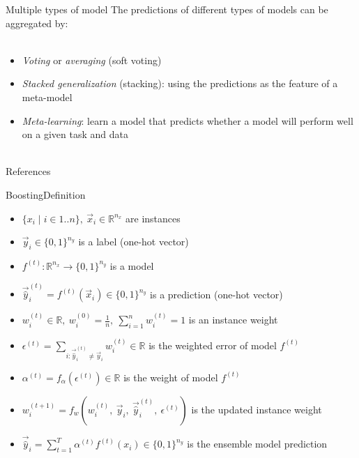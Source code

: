 \documentclass[10pt]{beamer}
\begin{document}
\begin{frame}{Multiple types of model}
  The predictions of different types of models can be aggregated by:
  \\~\
  \begin{itemize}
    \item \emph{Voting} or \emph{averaging} (soft voting)
    \item \emph{Stacked generalization} (stacking): using the predictions as
          the feature of a meta-model
    \item \emph{Meta-learning}: learn a model that predicts whether a model
          will perform well on a given task and data
          \\~\
  \end{itemize}
\end{frame}

\begin{frame}[allowframebreaks]{References}
  \renewcommand*{\bibfont}{\footnotesize}
  \printbibliography
\end{frame}

\begin{frame}{Boosting}{Definition}
  \begin{itemize}
    \item $\{x_i \mid i \in 1 .. n\},\ \vec{x}_i \in \mathbb{R}^{n_x}$ are
          instances
    \item $\vec{y}_i \in \{0,1\}^{n_y}$ is a label (one-hot vector)
    \item $f^{(t)} : \mathbb{R}^{n_x} \to \{0,1\}^{n_y}$ is a model
    \item $\vec{\hat{y}}_i^{(t)} = f^{(t)}(\vec{x}_i) \in \{0,1\}^{n_y}$ is a
          prediction (one-hot vector)
    \item $w_i^{(t)} \in \mathbb{R},\ w_i^{(0)} = \frac{1}{n},\
            \sum_{i = 1}^{n}w^{(t)}_i = 1$ is an instance weight
    \item $\epsilon^{(t)} = \sum_{i : \vec{\hat{y}}_i^{(t)} \neq \vec{y}_i}
            w^{(t)}_i \in \mathbb{R}$ is the weighted error of model $f^{(t)}$
    \item $\alpha^{(t)} = f_\alpha(\epsilon^{(t)}) \in \mathbb{R}$ is the weight
          of model $f^{(t)}$
    \item $w^{(t+1)}_i = f_w(w^{(t)}_i,\ \vec{y}_i,\ \vec{\hat{y}}_i^{(t)},\
            \epsilon^{(t)})$ is the updated instance weight
    \item $\vec{\hat{y}}_i = \sum_{t = 1}^{T}\alpha^{(t)}f^{(t)}(x_i)
            \in \{0,1\}^{n_y}$ is the ensemble model prediction
  \end{itemize}
\end{frame}
\end{document}
